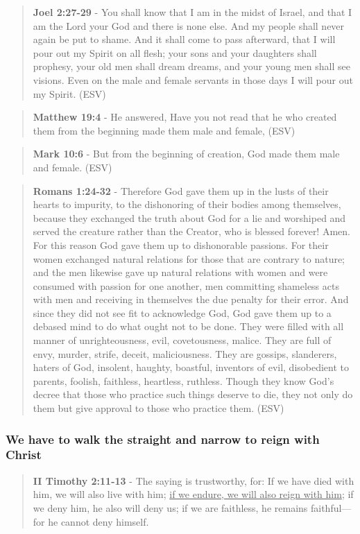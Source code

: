 \documentclass[11pt]{article}
\begin{document}
\begin{quote}
\textbf{Joel 2:27-29} - You shall know that I am in the midst of Israel, and that I am the Lord your God and there is none else. And my people shall never again be put to shame. And it shall come to pass afterward, that I will pour out my Spirit on all flesh; your sons and your daughters shall prophesy, your old men shall dream dreams, and your young men shall see visions. Even on the male and female servants in those days I will pour out my Spirit. (ESV)
\end{quote}

\begin{quote}
\textbf{Matthew 19:4} - He answered, Have you not read that he who created them from the beginning made them male and female, (ESV)
\end{quote}

\begin{quote}
\textbf{Mark 10:6} - But from the beginning of creation, God made them male and female. (ESV)
\end{quote}

\begin{quote}
\textbf{Romans 1:24-32} - Therefore God gave them up in the lusts of their hearts to impurity, to the dishonoring of their bodies among themselves, because they exchanged the truth about God for a lie and worshiped and served the creature rather than the Creator, who is blessed forever! Amen. For this reason God gave them up to dishonorable passions. For their women exchanged natural relations for those that are contrary to nature; and the men likewise gave up natural relations with women and were consumed with passion for one another, men committing shameless acts with men and receiving in themselves the due penalty for their error. And since they did not see fit to acknowledge God, God gave them up to a debased mind to do what ought not to be done. They were filled with all manner of unrighteousness, evil, covetousness, malice. They are full of envy, murder, strife, deceit, maliciousness. They are gossips, slanderers, haters of God, insolent, haughty, boastful, inventors of evil, disobedient to parents, foolish, faithless, heartless, ruthless. Though they know God's decree that those who practice such things deserve to die, they not only do them but give approval to those who practice them. (ESV)
\end{quote}

\subsubsection{We have to walk the straight and narrow to reign with Christ}
\label{sec:org3e53381}
\begin{quote}
\textbf{II Timothy 2:11-13} - The saying is trustworthy, for: If we have died with him, we will also live with him; \uline{if we endure, we will also reign with him}; if we deny him, he also will deny us; if we are faithless, he remains faithful— for he cannot deny himself.
\end{quote}
\end{document}
